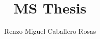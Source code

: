 \documentclass[12pt]{report}
\theoremstyle{definition}
\begin{document}
\title{MS Thesis}
\author{Renzo Miguel Caballero Rosas} 
\maketitle

\pagebreak
\tableofcontents
\pagebreak














\end{document}
